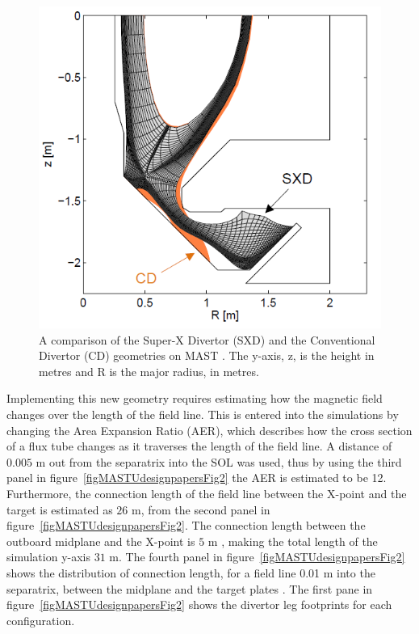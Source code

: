 \documentclass[12pt]{article}  %
\begin{document}
\begin{figure}[h]
\includegraphics[scale=0.5]{Figures/CDvsSXD.png}
\centering
\caption{A comparison of the Super-X Divertor (SXD) and the Conventional Divertor (CD) geometries on MAST \cite{Havlickova2014}. The y-axis, z, is the height in metres and R is the major radius, in metres.}\label{figCDvsSXD}
\end{figure}

Implementing this new geometry requires estimating how the magnetic field changes over the length of the field line. This is entered into the simulations by changing the Area Expansion Ratio (AER), which describes how the cross section of a flux tube changes as it traverses the length of the field line. A distance of $0.005$ m out from the separatrix into the SOL was used, thus by using the third panel in figure~\ref{figMASTUdesignpapersFig2} the AER is estimated to be 12. Furthermore, the connection length of the field line between the X-point and the target is estimated as $26$ m, from the second panel in figure~\ref{figMASTUdesignpapersFig2}. The connection length between the outboard midplane and the X-point is $5$ m \cite{Fishpool2013}, making the total length of the simulation y-axis $31$ m. The fourth panel in figure~\ref{figMASTUdesignpapersFig2} shows the distribution of connection length, for a field line 0.01 m into the separatrix, between the midplane and the target plates \cite{Fishpool2013}. The first pane in figure~\ref{figMASTUdesignpapersFig2} shows the divertor leg footprints for each configuration.
\end{document}
